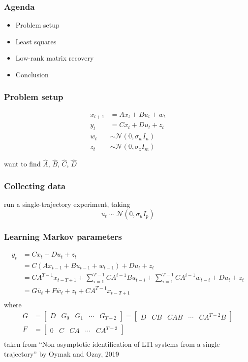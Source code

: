 \begin{frame}
\frametitle{Agenda}
\begin{itemize}
\item Problem setup
\item Least squares
\item Low-rank matrix recovery
\item Conclusion
\end{itemize}
\end{frame}

\begin{frame}
\frametitle{Problem setup}
\begin{align*}
x_{t+1} &= A x_t + B u_t + w_t \\
y_t &= C x_t + D u_t + z_t \\
w_t &\sim \mathcal N (0, \sigma_w I_n) \\
z_t &\sim \mathcal N (0, \sigma_z I_m)
\end{align*}

want to find $\hat A$, $\hat B$, $\hat C$, $\hat D$
\end{frame}

\begin{frame}
\frametitle{Collecting data}
run a single-trajectory experiment, taking
\[u_t \sim \mathcal N (0, \sigma_u I_p)\]
\end{frame}

\begin{frame}
\frametitle{Learning Markov parameters}
\begin{align*}
y_t
&= C x_t + D u_t + z_t \\
&= C (A x_{t-1} + B u_{t-1} + w_{t-1}) + D u_t + z_t \\
&= C A^{T-1} x_{t-T+1} + \sum _{i=1} ^{T-1} C A^{i-1} B u_{t-i}
  + \sum _{i=1} ^{T-1} C A^{i-1} w_{t-i} + D u_t + z_t \\
&= G \overline{u}_t + F \overline{w}_t + z_t + C A^{T-1} x_{t-T+1} \\
\end{align*}
where
\begin{align*}
G &= \begin{bmatrix} D & G_0 & G_1 & \cdots & G_{T-2} \end{bmatrix}
= \begin{bmatrix} D & C B & C A B & \cdots & C A^{T-2} B \end{bmatrix} \\
F &= \begin{bmatrix} 0 & C & C A & \cdots & C A^{T-2} \end{bmatrix} \\
\end{align*}
taken from
``Non-asymptotic identification of LTI systems from a single trajectory''
by Oymak and Ozay, 2019
\end{frame}

